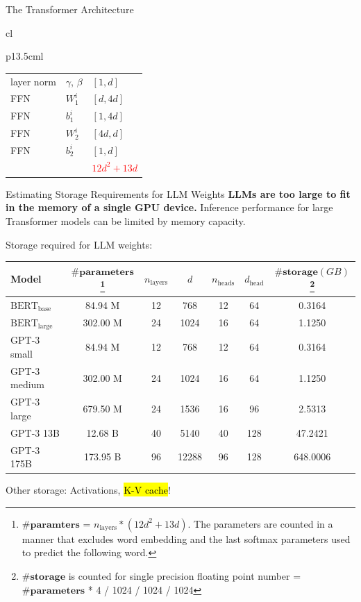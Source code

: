 \begin{frame}[fragile]{The Transformer Architecture}
\begin{tabular}{cl}
\begin{tabular}{p{13.5cm}l}
{\begin{itemize}
{\begin{tabular}{lll}
                    layer norm & $\gamma$, $\beta$ & $[1, d]$ \\
                    FFN & $W_1^i$ & $[d, 4d]$ \\
                    FFN & $b_1^i$ & $[1, 4d]$ \\
                    FFN & $W_2^i$ & $[4d, d]$ \\
                    FFN & $b_2^i$ & $[1, d]$ \\ \hline
                    \text{In Total}&& \textcolor{red}{$12d^2+13d$}\\\hline
                \end{tabular}
                }
            \end{itemize}
        }
    \end{tabular}
\end{tabular}
\end{frame}

\begin{frame}{Estimating Storage Requirements for LLM Weights}
    \textbf{LLMs are too large to fit in the memory of a single GPU device.} Inference performance for large Transformer models can be limited by memory capacity.
    
    \begin{itemize}
        \item Storage required for LLM weights:
        \item[]
        \scriptsize{
            \begin{tabular}{lcccccc}
            \textbf{Model} & $\#\textbf{parameters}$\footnote{$\#\textbf{paramters}$ = $n_{\text{layers}}*(12d^2+13d)$. The parameters are counted in a manner that excludes word embedding and the last softmax parameters used to predict the following word.} & $n_{\text{layers}}$ & $d$ & $n_{\text{heads}}$ & $d_{\text{head}}$& $\#\textbf{storage}(GB)$\footnote{$\#\textbf{storage}$ is counted for single precision floating point number = $\#\textbf{parameters}$ * 4 / 1024 / 1024 / 1024 }\\\toprule[1.5pt]
            $\text{BERT}_{\text{base}}$ &84.94 M&12 &768 &12&64&0.3164\\
            $\text{BERT}_{\text{large}}$ &302.00 M&24 &1024 &16&64&1.1250\\
            GPT-3 small &84.94 M&12&768&12&64&0.3164\\
            GPT-3 medium &302.00 M&24&1024&16&64&1.1250 \\
            GPT-3 large &679.50 M&24&1536&16&96&2.5313\\
            GPT-3 13B &12.68 B&40&5140&40&128&47.2421 \\
            GPT-3 175B &173.95 B&96&12288&96&128&648.0006\\
        \end{tabular}
        }
        \normalsize{
        \item Other storage: Activations, \hl{K-V cache}!
        }
    \end{itemize}
    \end{frame}


